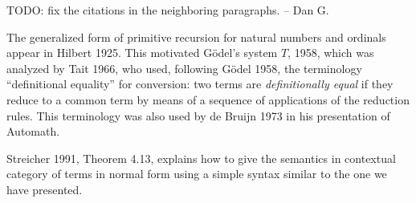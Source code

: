 TODO: fix the citations in the neighboring paragraphs. -- Dan G.

 The generalized form of primitive recursion for natural numbers and ordinals appear in Hilbert 1925.
This motivated G\"odel's system $T$, 1958, which was analyzed by Tait 1966, who used, following
G\"odel 1958, the terminology
``definitional equality'' for conversion: two terms are {\em definitionally equal} if they reduce
to a common term by means of a sequence of applications of the reduction rules. This terminology was
also used by de Bruijn 1973 in his presentation of Automath.

 Streicher 1991, Theorem 4.13, explains how to give the semantics in contextual category of terms in normal
form using a simple syntax similar to the one we have presented.

\egroup


